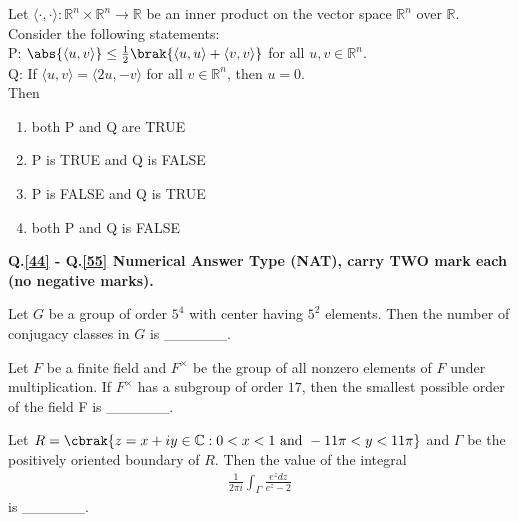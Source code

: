 \iffalse
\chapter{2021}
\author{AI24BTECH11015 - Harshvardhan Patidar}
\section{ma}
\fi
    \item Let $\langle \cdot, \cdot \rangle : \mathbb{R}^n \times \mathbb{R}^n \rightarrow \mathbb{R}$ be an inner product on the vector space $\mathbb{R}^n$ over $\mathbb{R}$. Consider the following statements:\\ P: $\abs{\langle u,v \rangle} \leq \frac{1}{2}\brak{\langle u,u \rangle + \langle v,v \rangle}$ for all $u,v \in \mathbb{R}^n$.\\Q: If $\langle u,v \rangle = \langle 2u,-v \rangle$ for all $v \in \mathbb{R}^n$, then $u=0$.\\Then
        \begin{enumerate}
            \item both P and Q are TRUE
            \item P is TRUE and Q is FALSE
            \item P is FALSE and Q is TRUE
            \item both P and Q is FALSE
        \end{enumerate}

        \item[] \textbf{Q.\ref{44} - Q.\ref{55} Numerical Answer Type (NAT), carry TWO mark each (no negative marks).}
    \item \label{44} Let $G$ be a group of order $5^4$ with center having $5^2$ elements. Then the number of conjugacy classes in $G$ is \_\_\_\_\_\_.
    \item Let $F$ be a finite field and $F^{\times}$ be the group of all nonzero elements of $F$ under multiplication. If $F^{\times}$ has a subgroup of order $17$, then the smallest possible order of the field F is \_\_\_\_\_\_.
    \item Let $R = \cbrak{z = x + iy \in \mathbb{C} : 0< x<1 \text{ and }-11 \pi < y < 11 \pi}$ and $\Gamma$ be the positively oriented boundary of $R$. Then the value of the integral
        \begin{align*}
            \frac{1}{2 \pi i} \int_{\Gamma} \frac{e^z dz}{e^z - 2}
        \end{align*}
        is \_\_\_\_\_\_.

